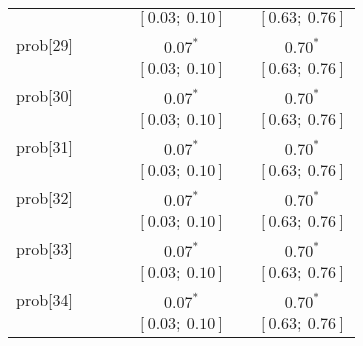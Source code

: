 \begin{table}
\begin{center}
\begin{tabular}{l c c c c c c }
          &                           &                           &                           & $[0.03;\ 0.10]$         &                           & $[0.63;\ 0.76]$       \\
prob[29]  &                           &                           &                           & $0.07^{*}$              &                           & $0.70^{*}$            \\
          &                           &                           &                           & $[0.03;\ 0.10]$         &                           & $[0.63;\ 0.76]$       \\
prob[30]  &                           &                           &                           & $0.07^{*}$              &                           & $0.70^{*}$            \\
          &                           &                           &                           & $[0.03;\ 0.10]$         &                           & $[0.63;\ 0.76]$       \\
prob[31]  &                           &                           &                           & $0.07^{*}$              &                           & $0.70^{*}$            \\
          &                           &                           &                           & $[0.03;\ 0.10]$         &                           & $[0.63;\ 0.76]$       \\
prob[32]  &                           &                           &                           & $0.07^{*}$              &                           & $0.70^{*}$            \\
          &                           &                           &                           & $[0.03;\ 0.10]$         &                           & $[0.63;\ 0.76]$       \\
prob[33]  &                           &                           &                           & $0.07^{*}$              &                           & $0.70^{*}$            \\
          &                           &                           &                           & $[0.03;\ 0.10]$         &                           & $[0.63;\ 0.76]$       \\
prob[34]  &                           &                           &                           & $0.07^{*}$              &                           & $0.70^{*}$            \\
          &                           &                           &                           & $[0.03;\ 0.10]$         &                           & $[0.63;\ 0.76]$       \\

\end{tabular}
\end{center}
\end{table}
